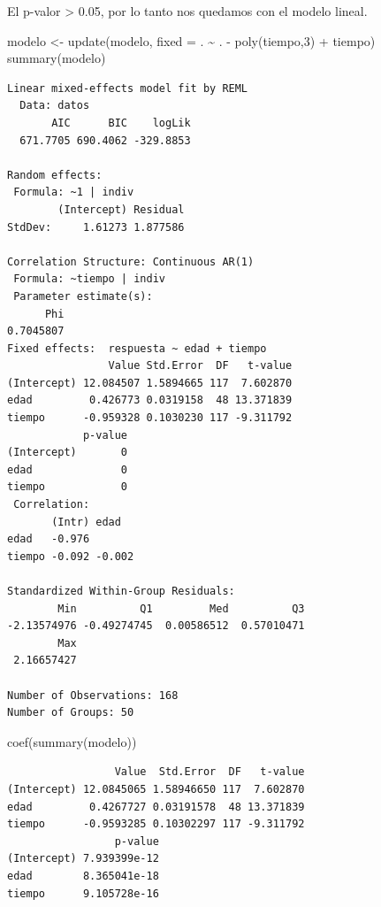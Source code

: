 \documentclass[
]{book}
\newenvironment{Shaded}{\begin{snugshade}}{\end{snugshade}}
\newcommand{\AttributeTok}[1]{\textcolor[rgb]{0.77,0.63,0.00}{#1}}
\newcommand{\DecValTok}[1]{\textcolor[rgb]{0.00,0.00,0.81}{#1}}
\newcommand{\FunctionTok}[1]{\textcolor[rgb]{0.00,0.00,0.00}{#1}}
\newcommand{\NormalTok}[1]{#1}
\newcommand{\OtherTok}[1]{\textcolor[rgb]{0.56,0.35,0.01}{#1}}
\newcommand{\SpecialCharTok}[1]{\textcolor[rgb]{0.00,0.00,0.00}{#1}}
\begin{document}
El p-valor \textgreater{} 0.05, por lo tanto nos quedamos con el modelo lineal.

\begin{Shaded}
\begin{Highlighting}[]
\NormalTok{modelo }\OtherTok{\textless{}{-}} \FunctionTok{update}\NormalTok{(modelo, }\AttributeTok{fixed =}\NormalTok{ . }\SpecialCharTok{\textasciitilde{}}\NormalTok{ . }\SpecialCharTok{{-}} \FunctionTok{poly}\NormalTok{(tiempo,}\DecValTok{3}\NormalTok{) }\SpecialCharTok{+}\NormalTok{ tiempo)}
\FunctionTok{summary}\NormalTok{(modelo)}
\end{Highlighting}
\end{Shaded}

\begin{verbatim}
Linear mixed-effects model fit by REML
  Data: datos 
       AIC      BIC    logLik
  671.7705 690.4062 -329.8853

Random effects:
 Formula: ~1 | indiv
        (Intercept) Residual
StdDev:     1.61273 1.877586

Correlation Structure: Continuous AR(1)
 Formula: ~tiempo | indiv 
 Parameter estimate(s):
      Phi 
0.7045807 
Fixed effects:  respuesta ~ edad + tiempo 
                Value Std.Error  DF   t-value
(Intercept) 12.084507 1.5894665 117  7.602870
edad         0.426773 0.0319158  48 13.371839
tiempo      -0.959328 0.1030230 117 -9.311792
            p-value
(Intercept)       0
edad              0
tiempo            0
 Correlation: 
       (Intr) edad  
edad   -0.976       
tiempo -0.092 -0.002

Standardized Within-Group Residuals:
        Min          Q1         Med          Q3 
-2.13574976 -0.49274745  0.00586512  0.57010471 
        Max 
 2.16657427 

Number of Observations: 168
Number of Groups: 50 
\end{verbatim}

\begin{Shaded}
\begin{Highlighting}[]
\FunctionTok{coef}\NormalTok{(}\FunctionTok{summary}\NormalTok{(modelo))}
\end{Highlighting}
\end{Shaded}

\begin{verbatim}
                 Value  Std.Error  DF   t-value
(Intercept) 12.0845065 1.58946650 117  7.602870
edad         0.4267727 0.03191578  48 13.371839
tiempo      -0.9593285 0.10302297 117 -9.311792
                 p-value
(Intercept) 7.939399e-12
edad        8.365041e-18
tiempo      9.105728e-16
\end{verbatim}
\end{document}
